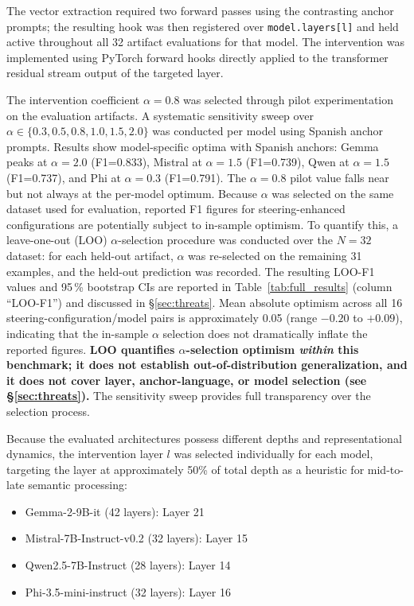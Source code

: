\documentclass{ieeeaccess}
\begin{document}
The vector extraction required two forward passes using the contrasting anchor prompts; the resulting hook was then registered over \texttt{model.layers[l]} and held active throughout all 32 artifact evaluations for that model. The intervention was implemented using PyTorch forward hooks directly applied to the transformer residual stream output of the targeted layer.

The intervention coefficient $\alpha=0.8$ was selected through pilot experimentation on the evaluation artifacts. A systematic sensitivity sweep over $\alpha \in \{0.3, 0.5, 0.8, 1.0, 1.5, 2.0\}$ was conducted per model using Spanish anchor prompts. Results show model-specific optima with Spanish anchors: Gemma peaks at $\alpha=2.0$ (F1=0.833), Mistral at $\alpha=1.5$ (F1=0.739), Qwen at $\alpha=1.5$ (F1=0.737), and Phi at $\alpha=0.3$ (F1=0.791). The $\alpha=0.8$ pilot value falls near but not always at the per-model optimum. Because $\alpha$ was selected on the same dataset used for evaluation, reported F1 figures for steering-enhanced configurations are potentially subject to in-sample optimism. To quantify this, a leave-one-out (LOO) $\alpha$-selection procedure was conducted over the $N=32$ dataset: for each held-out artifact, $\alpha$ was re-selected on the remaining 31 examples, and the held-out prediction was recorded. The resulting LOO-F1 values and 95\,\% bootstrap CIs are reported in Table~\ref{tab:full_results} (column ``LOO-F1'') and discussed in §\ref{sec:threats}. Mean absolute optimism across all 16 steering-configuration/model pairs is approximately 0.05 (range $-0.20$ to $+0.09$), indicating that the in-sample $\alpha$ selection does not dramatically inflate the reported figures. \textbf{LOO quantifies $\alpha$-selection optimism \emph{within} this benchmark; it does not establish out-of-distribution generalization, and it does not cover layer, anchor-language, or model selection (see §\ref{sec:threats}).} The sensitivity sweep provides full transparency over the selection process.

Because the evaluated architectures possess different depths and representational dynamics, the intervention layer $l$ was selected individually for each model, targeting the layer at approximately 50\% of total depth as a heuristic for mid-to-late semantic processing:

\begin{itemize}
    \item Gemma-2-9B-it (42 layers): Layer 21
    \item Mistral-7B-Instruct-v0.2 (32 layers): Layer 15
    \item Qwen2.5-7B-Instruct (28 layers): Layer 14
    \item Phi-3.5-mini-instruct (32 layers): Layer 16
\end{itemize}
\end{document}
